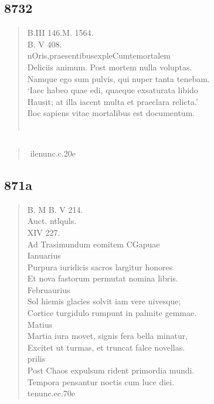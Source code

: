 \documentclass[11pt, a4paper]{report}
\begin{document}
            \subsection*{8732}
      \begin{verse}
      B.III 146.M. 1564. \\ B. V 408. \\ nOris,praesentibusexpleCumtemortalem \\ Deliciis animum. Post mortem nulla voluptas. \\ Namque ego sum pulvis, qui nuper tanta tenebam. \\ ‘Iaec habeo quae edi, quaeque exsaturata libido \\ Hausit; at illa iacent multa et praeclara relicta.’ \\ Iloc sapiens vitae mortalibus est documentum. \\ 
        ﻿\pagebreak 
      \end{verse}
  
            \subsection*{}
      \begin{verse}
        ﻿\pagebreak 
     \marginpar{[874]} ilenunc.c.20e \\ 
      \end{verse}
  
            \subsection*{871a}
      \begin{verse}
      B. M B. V 214. \\ Auct. ntlquls. \\ XIV 227. \\ Ad Trasimundum eomitem CGapuae \\ Ianuarius \\ Purpura iuridicis sacros largitur honores \\ Et nova fastorum permutat nomina libris. \\ Februaurius \\ Sol hiemis glacies solvit iam vere nivesque; \\ Cortice turgidulo rumpunt in palmite gemmae. \\ Matius \\ Martia iura movet, signis fera bella minatur, \\ Excitet ut turmas, et truncat falce novellas. \\ prilis \\ Post Chaos expulsum rident primordia mundi. \\ Tempora pensantur noctis cum luce diei. \\ 
        ﻿\pagebreak 
     \marginpar{[874]} tenunc.ec.70e \\ 
      \end{verse}
  
\end{document}
